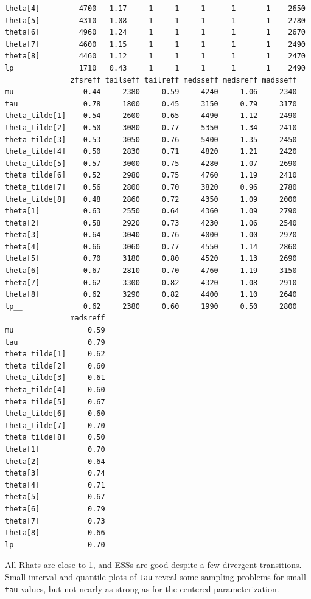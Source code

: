 \documentclass[american,]{article}
\begin{document}
\begin{verbatim}
theta[4]         4700   1.17     1     1     1      1       1    2650
theta[5]         4310   1.08     1     1     1      1       1    2780
theta[6]         4960   1.24     1     1     1      1       1    2670
theta[7]         4600   1.15     1     1     1      1       1    2490
theta[8]         4460   1.12     1     1     1      1       1    2470
lp__             1710   0.43     1     1     1      1       1    2490
               zfsreff tailseff tailreff medsseff medsreff madsseff
mu                0.44     2380     0.59     4240     1.06     2340
tau               0.78     1800     0.45     3150     0.79     3170
theta_tilde[1]    0.54     2600     0.65     4490     1.12     2490
theta_tilde[2]    0.50     3080     0.77     5350     1.34     2410
theta_tilde[3]    0.53     3050     0.76     5400     1.35     2450
theta_tilde[4]    0.50     2830     0.71     4820     1.21     2420
theta_tilde[5]    0.57     3000     0.75     4280     1.07     2690
theta_tilde[6]    0.52     2980     0.75     4760     1.19     2410
theta_tilde[7]    0.56     2800     0.70     3820     0.96     2780
theta_tilde[8]    0.48     2860     0.72     4350     1.09     2000
theta[1]          0.63     2550     0.64     4360     1.09     2790
theta[2]          0.58     2920     0.73     4230     1.06     2540
theta[3]          0.64     3040     0.76     4000     1.00     2970
theta[4]          0.66     3060     0.77     4550     1.14     2860
theta[5]          0.70     3180     0.80     4520     1.13     2690
theta[6]          0.67     2810     0.70     4760     1.19     3150
theta[7]          0.62     3300     0.82     4320     1.08     2910
theta[8]          0.62     3290     0.82     4400     1.10     2640
lp__              0.62     2380     0.60     1990     0.50     2800
               madsreff
mu                 0.59
tau                0.79
theta_tilde[1]     0.62
theta_tilde[2]     0.60
theta_tilde[3]     0.61
theta_tilde[4]     0.60
theta_tilde[5]     0.67
theta_tilde[6]     0.60
theta_tilde[7]     0.70
theta_tilde[8]     0.50
theta[1]           0.70
theta[2]           0.64
theta[3]           0.74
theta[4]           0.71
theta[5]           0.67
theta[6]           0.79
theta[7]           0.73
theta[8]           0.66
lp__               0.70
\end{verbatim}

All Rhats are close to 1, and ESSs are good despite a few divergent
transitions. Small interval and quantile plots of \texttt{tau} reveal
some sampling problems for small \texttt{tau} values, but not nearly as
strong as for the centered parameterization.
\end{document}

